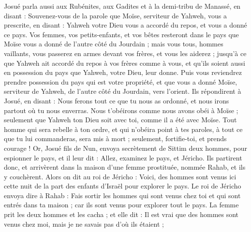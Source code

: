 \begin{multicols}{2}
Josué parla aussi aux Rubénites, aux Gadites et à la demi-tribu de Manassé, en disant :
Souvenez-vous de la parole que Moïse, serviteur de Yahweh, vous a prescrite, en disant : Yahweh votre Dieu vous a accordé du repos, et vous a donné ce pays.
Vos femmes, vos petits-enfants, et vos bêtes resteront dans le pays que Moïse vous a donné de l’autre côté du Jourdain ; mais vous tous, hommes vaillants, vous passerez en armes devant vos frères, et vous les aiderez ;
jusqu’à ce que Yahweh ait accordé du repos à vos frères comme à vous, et qu’ils soient aussi en possession du pays que Yahweh, votre Dieu, leur donne. Puis vous reviendrez prendre possession du pays qui est votre propriété, et que vous a donné Moïse, serviteur de Yahweh, de l’autre côté du Jourdain, vers l’orient.
Ils répondirent à Josué, en disant : Nous ferons tout ce que tu nous as ordonné, et nous irons partout où tu nous enverras.
Nous t’obéirons comme nous avons obéi à Moïse ; seulement que Yahweh ton Dieu soit avec toi, comme il a été avec Moïse.
Tout homme qui sera rebelle à ton ordre, et qui n’obéira point à tes paroles, à tout ce que tu lui commanderas, sera mis à mort ; seulement, fortifie-toi, et prends courage !
\VerseOne{}Or, Josué fils de Nun, envoya secrètement de Sittim deux hommes, pour espionner le pays, et il leur dit : Allez, examinez le pays, et Jéricho. Ils partirent donc, et arrivèrent dans la maison d’une femme prostituée, nommée Rahab, et ils y couchèrent.
Alors on dit au roi de Jéricho : Voici, des hommes sont venus ici cette nuit de la part des enfants d’Israël pour explorer le pays.
Le roi de Jéricho envoya dire à Rahab : Fais sortir les hommes qui sont venus chez toi et qui sont entrés dans ta maison ; car ils sont venus pour explorer tout le pays.
La femme prit les deux hommes et les cacha ; et elle dit : Il est vrai que des hommes sont venus chez moi, mais je ne savais pas d’où ils étaient ;

\end{multicols}
